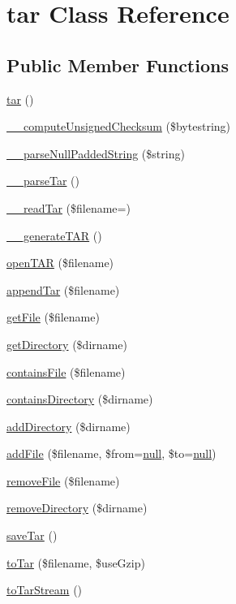 \hypertarget{classtar}{}\section{tar Class Reference}
\label{classtar}
\subsection*{Public Member Functions}
\begin{DoxyCompactItemize}
\item 
\hyperlink{classtar_a310c3cc3417ea0fdb5c1c96cc5b47efa}{tar} ()
\item 
\hyperlink{classtar_a2f9a99c49a3ab86475a1cd26e722c0fa}{\+\_\+\+\_\+compute\+Unsigned\+Checksum} (\$bytestring)
\item 
\hyperlink{classtar_ab9d60205cd0862d6d3cfb582b43a3288}{\+\_\+\+\_\+parse\+Null\+Padded\+String} (\$string)
\item 
\hyperlink{classtar_a8d8793668fa7e2de0beb4dca399ee3ed}{\+\_\+\+\_\+parse\+Tar} ()
\item 
\hyperlink{classtar_a1422972f8f5afac82f82ecab505b4079}{\+\_\+\+\_\+read\+Tar} (\$filename=\textquotesingle{}\textquotesingle{})
\item 
\hyperlink{classtar_a97fd04b02c85bbb3eb588a160237f375}{\+\_\+\+\_\+generate\+T\+AR} ()
\item 
\hyperlink{classtar_a62fc429d1e33de90d1ce65c3c16a4193}{open\+T\+AR} (\$filename)
\item 
\hyperlink{classtar_a3c35ee6b05a860a0108afa5853db4070}{append\+Tar} (\$filename)
\item 
\hyperlink{classtar_a8eb93e97f657daf1a3671c60f7093745}{get\+File} (\$filename)
\item 
\hyperlink{classtar_a02157ed6604bec5f931ad08d1c5c048f}{get\+Directory} (\$dirname)
\item 
\hyperlink{classtar_ac7ba975f7bcf57d9a8167feb7122933e}{contains\+File} (\$filename)
\item 
\hyperlink{classtar_aff90f763b61b935c856eb7e634a2c0a7}{contains\+Directory} (\$dirname)
\item 
\hyperlink{classtar_a046188f5c3141d52246774c13ab2c895}{add\+Directory} (\$dirname)
\item 
\hyperlink{classtar_a374a307255a5fc5110749b1e37946947}{add\+File} (\$filename, \$from=\hyperlink{modernizr_8min_8js_a286f9ec831c5e676eeb493248eab9575}{null}, \$to=\hyperlink{modernizr_8min_8js_a286f9ec831c5e676eeb493248eab9575}{null})
\item 
\hyperlink{classtar_a51cd4b11f9e4e6c9c5c0bc93d5a063c7}{remove\+File} (\$filename)
\item 
\hyperlink{classtar_a17971edb42a8be66b554ca5d6cf6bc1e}{remove\+Directory} (\$dirname)
\item 
\hyperlink{classtar_ac70edc9fc85a3106aaa3c07a3a57a0a2}{save\+Tar} ()
\item 
\hyperlink{classtar_acfe90e92d12e463da735e3c42e5a74f1}{to\+Tar} (\$filename, \$use\+Gzip)
\item 
\hyperlink{classtar_a347041e79cbe8f150933afe77f35826f}{to\+Tar\+Stream} ()
\end{DoxyCompactItemize}
